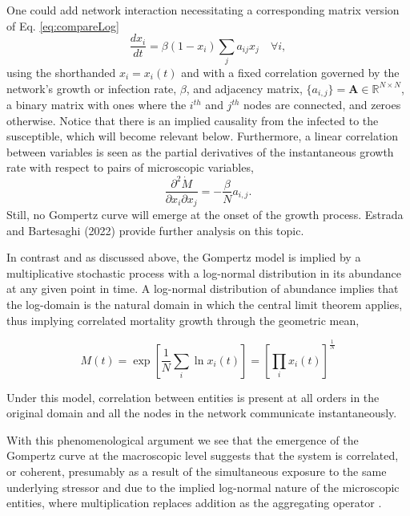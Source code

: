 \documentclass{article}
\begin{document}
One could add network interaction necessitating a corresponding matrix version of Eq. \ref{eq:compareLog}
\begin{equation}
\label{eq:networkSIR}
\frac{d x_i}{dt} = \beta (1-x_i)\sum_j{a_{ij}}x_j \quad \forall i,
\end{equation}
using the shorthanded $x_i=x_i(t)$ and with a fixed correlation governed by the network's growth or infection rate, $\beta$, and adjacency matrix, $\{a_{i,j}\}=\mathbf{A} \in \mathbb{R}^{N \times N}$, a binary matrix with ones where the $i^{th}$ and $j^{th}$ nodes are connected, and zeroes otherwise. Notice that there is an implied causality from the infected to the susceptible, which will become relevant below. Furthermore, a linear correlation between variables is seen as the partial derivatives of the instantaneous growth rate with respect to pairs of microscopic variables,
\begin{equation}
\frac{\partial^2 \dot{M}}{\partial x_i \partial x_j} = -\frac{\beta}{N} a_{i,j}.
\end{equation}
Still, no Gompertz curve will emerge at the onset of the growth process. Estrada and Bartesaghi (2022) \cite{estrada2022networked} provide further analysis on this topic.

In contrast and as discussed above, the Gompertz model is implied by a multiplicative stochastic process with a log-normal distribution in its abundance at any given point in time. A log-normal distribution of abundance implies that the log-domain is the natural domain in which the central limit theorem applies, thus implying correlated mortality growth through the geometric mean,

\begin{equation}
M(t) = \exp \left[\frac{1}{N}\sum_i \ln x_i(t)\right] = \left[\prod_i x_i (t)\right]^{\frac{1}{N}}
\end{equation} 

Under this model, correlation between entities is present at all orders in the original domain and all the nodes in the network communicate instantaneously.

With this phenomenological argument we see that the emergence of the Gompertz curve at the macroscopic level suggests that the system is correlated, or coherent, presumably as a result of the simultaneous exposure to the same underlying stressor and due to the implied log-normal nature of the microscopic entities, where multiplication replaces addition as the aggregating operator \cite{zhang1994log}. 
\end{document}
